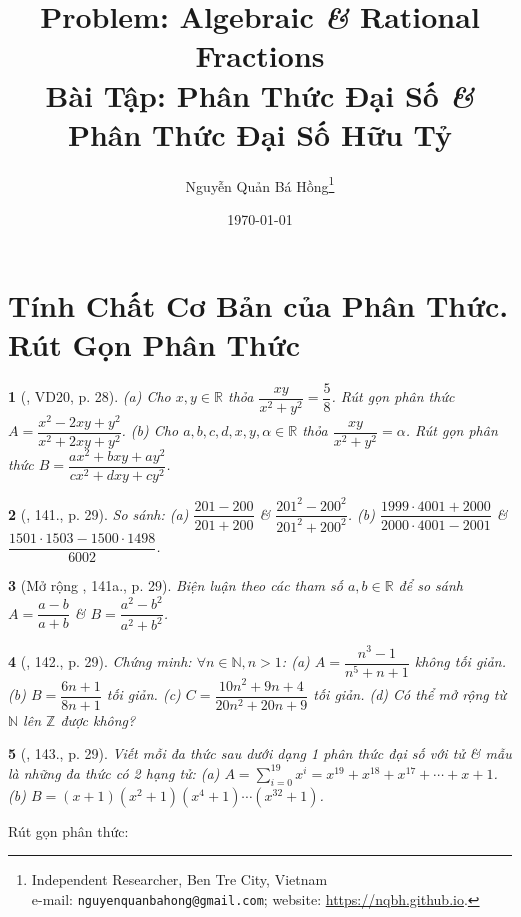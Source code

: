 \documentclass{article}
\title{Problem: Algebraic {\it\&} Rational Fractions\\Bài Tập: Phân Thức Đại Số {\it\&} Phân Thức Đại Số Hữu Tỷ}
\author{Nguyễn Quản Bá Hồng\footnote{Independent Researcher, Ben Tre City, Vietnam\\e-mail: \texttt{nguyenquanbahong@gmail.com}; website: \url{https://nqbh.github.io}.}}
\date{\today}
\newtheorem{baitoan}{}
\begin{document}
\maketitle
\tableofcontents


\section{Tính Chất Cơ Bản của Phân Thức. Rút Gọn Phân Thức}

\begin{baitoan}[\cite{Tuyen_Toan_8}, VD20, p. 28]
	(a) Cho $x,y\in\mathbb{R}$ thỏa $\dfrac{xy}{x^2 + y^2} = \dfrac{5}{8}$. Rút gọn phân thức $A = \dfrac{x^2 - 2xy + y^2}{x^2 + 2xy + y^2}$. (b) Cho $a,b,c,d,x,y,\alpha\in\mathbb{R}$ thỏa $\dfrac{xy}{x^2 + y^2} = \alpha$. Rút gọn phân thức $B = \dfrac{ax^2 + bxy + ay^2}{cx^2 + dxy + cy^2}$.
\end{baitoan}

\begin{baitoan}[\cite{Tuyen_Toan_8}, 141., p. 29]
	So sánh: (a) $\dfrac{201 - 200}{201 + 200}$ \& $\dfrac{201^2 - 200^2}{201^2 + 200^2}$. (b) $\dfrac{1999\cdot 4001 + 2000}{2000\cdot 4001 - 2001}$ \& $\dfrac{1501\cdot 1503 - 1500\cdot 1498}{6002}$.
\end{baitoan}

\begin{baitoan}[Mở rộng \cite{Tuyen_Toan_8}, 141a., p. 29]
	Biện luận theo các tham số $a,b\in\mathbb{R}$ để so sánh $A = \dfrac{a - b}{a + b}$ \& $B = \dfrac{a^2 - b^2}{a^2 + b^2}$.
\end{baitoan}

\begin{baitoan}[\cite{Tuyen_Toan_8}, 142., p. 29]
	Chứng minh: $\forall n\in\mathbb{N},n > 1$: (a) $A = \dfrac{n^3 - 1}{n^5 + n + 1}$ không tối giản. (b) $B = \dfrac{6n + 1}{8n + 1}$ tối giản. (c) $C = \dfrac{10n^2 + 9n + 4}{20n^2 + 20n + 9}$ tối giản. (d) Có thể mở rộng từ $\mathbb{N}$ lên $\mathbb{Z}$ được không?
\end{baitoan}

\begin{baitoan}[\cite{Tuyen_Toan_8}, 143., p. 29]
	Viết mỗi đa thức sau dưới dạng 1 phân thức đại số với tử \& mẫu là những đa thức có 2 hạng tử: (a) $A = \sum_{i=0}^{19} x^i = x^{19} + x^{18} + x^{17} + \cdots + x + 1$. (b) $B = (x + 1)(x^2 + 1)(x^4 + 1)\cdots(x^{32} + 1)$.	
\end{baitoan}
Rút gọn phân thức:
\end{document}
